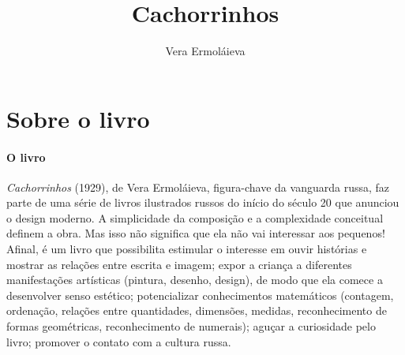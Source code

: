 \documentclass[11pt]{extarticle}
\newcommand{\AutorLivro}{Vera Ermoláieva}
\newcommand{\TituloLivro}{Cachorrinhos}
\newcommand{\colaborador}{{Paulo Pompermaier e Renier Silva}}
\begin{document}
\title{\TituloLivro}
\author{\AutorLivro}
\def\authornotes{\colaborador}

\date{}
\maketitle


\tableofcontents



\section{Sobre o livro}

\paragraph{O livro} \textit{Cachorrinhos} (1929), de Vera Ermoláieva, figura-chave da vanguarda russa, faz parte de uma série de livros ilustrados russos do início do século 20 que anunciou o design moderno.
A simplicidade da composição e a complexidade conceitual definem a obra. Mas isso não
significa que ela não vai interessar aos pequenos! Afinal, é um livro que possibilita
estimular o interesse em ouvir histórias e mostrar as relações entre
escrita e imagem; expor a criança a diferentes manifestações artísticas (pintura, desenho, design), de modo que ela comece a desenvolver senso estético; potencializar conhecimentos matemáticos (contagem, ordenação, relações entre quantidades, dimensões, medidas, reconhecimento de formas geométricas, reconhecimento de numerais); aguçar a curiosidade pelo livro; promover o contato com a cultura russa.

\end{document}

